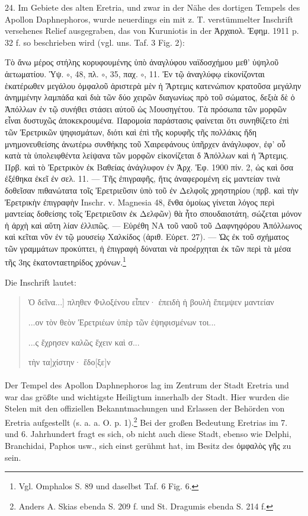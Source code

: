 \documentclass[a4paper, 11pt, oneside]{article}
\begin{document}
24. Im Gebiete des alten Eretria, und zwar in der Nähe des dortigen Tempels des Apollon Daphnephoros, wurde neuerdings ein mit z. T. verstümmelter Inschrift versehenes Relief ausgegraben, das von Kuruniotis in der Ἀρχαιολ. Ἐφημ. 1911 p. 32 f. so beschrieben wird (vgl. uns. Taf. 3 Fig. 2):

Τὸ ἄνω μέρος στήλης κορυφουμένης ὑπὸ ἀναγλύφου ναϊδοσχήμου μεθ' ὑψηλοῦ ἀετωματίου. Ὑψ. $\circ$, 48, πλ. $\circ$, 35, παχ. $\circ$, 11. Ἐν τῷ ἀναγλύφῳ εἰκονίζονται ἑκατέρωθεν μεγάλου ὀμφαλοῦ ἀριστερὰ μὲν ἡ Ἄρτεμις κατενώπιον κρατοῦσα μεγάλην ἀνημμένην λαμπάδα καὶ διὰ τῶν δύο χειρῶν διαγωνίως πρὸ τοῦ σώματος, δεξιὰ δὲ ὁ Ἀπόλλων ἐν τῷ συνήθει στάσει αὐτοῦ ὡς Μουσηγέτου. Τὰ πρόσωπα τῶν μορφῶν εἶναι δυστυχῶς ἀποκεκρουμένα. Παρομοία παράστασις φαίνεται ὅτι συνηθίζετο ἐπὶ τῶν Ἐρετρικῶν ψηφισμάτων, διότι καὶ ἐπὶ τῆς κορυφῆς τῆς πολλάκις ἤδη μνημονευθείσης ἀνωτέρω συνθήκης τοῦ Χαιρεφάνους ὑπῆρχεν ἀνάγλυφον, ἐφ' οὗ κατὰ τὰ ὑπολειφθέντα λείψανα τῶν μορφῶν εἰκονίζεται δ Ἀπόλλων καὶ ἡ Ἄρτεμις. Πρβ. καὶ τὸ Ἐρετρικὸν ἐκ Βαθείας ἀνάγλυφον ἐν Ἀρχ. Ἐφ. 1900 πίν. 2, ὡς καὶ ὅσα ἐξέθηκα ἐκεῖ ἐν σελ. 11. --- Τῆς ἐπιγραφῆς, ἥτις ἀναφερομένη εἰς μαντείαν τινὰ δοθεῖσαν πιθανώτατα τοῖς Ἐρετριεῦσιν ὑπὸ τοῦ ἐν Δελφοῖς χρηστηρίου (πρβ. καὶ τὴν Ἐρετρικὴν ἐπιγραφὴν Inschr. v. Magnesia 48, ἔνθα ὁμοίως γίνεται λόγος περὶ μαντείας δοθείσης τοῖς Ἐρετριεῦσιν ἐκ Δελφῶν) θὰ ἦτο σπουδαιοτάτη, σώζεται μόνον ἡ ἀρχὴ καὶ αὕτη λίαν ἐλλιπῶς. --- Εὑρέθη ΝΑ τοῦ ναοῦ τοῦ Δαφνηφόρου Ἀπόλλωνος καὶ κεῖται νῦν ἐν τῷ μουσείῳ Χαλκίδος (ἀριθ. Εὑρετ. 27). --- Ὡς ἐκ τοῦ σχήματος τῶν γραμμάτων προκύπτει, ἡ ἐπιγραφὴ δύναται νὰ προέρχηται ἐκ τῶν περὶ τὰ μέσα τῆς 3ης ἑκατονταετηρίδος χρόνων.\footnote{Vgl. Omphalos S. 89 und daselbst Taf. 6 Fig. 6.}

Die Inschrift lautet:
\begin{quotation}
Ὁ δεῖνα...] πληθεν Φιλοξένου εἶπεν· ἐπειδὴ ἡ βουλὴ ἔπεμψεν μαντείαν

\hspace*{5mm}...ον τὸν θεὸν Ἐρετριέων ὑπὲρ τῶν ἐψηφισμένων τοι...

\hspace*{10mm}...ς ἔχρησεν καλῶς ἔχειν καὶ σ...

\hspace*{15mm}τὴν τα]χίστην· ἔδο[ξε]ν
\end{quotation}
\paragraph{}
Der Tempel des Apollon Daphnephoros lag im Zentrum der Stadt Eretria und war das größte und wichtigste Heiligtum innerhalb der Stadt. Hier wurden die Stelen mit den offiziellen Bekanntmachungen und Erlassen der Behörden von Eretria aufgestellt (s. a. a. O. p. 1).\footnote{Anders A. Skias ebenda S. 209 f. und St. Dragumis ebenda S. 214 f.} Bei der großen Bedeutung Eretrias im 7. und 6. Jahrhundert fragt es sich, ob nicht auch diese Stadt, ebenso wie Delphi, Branchidai, Paphos usw., sich einst gerühmt hat, im Besitz des ὀμφαλὸς γῆς zu sein.
\end{document}
